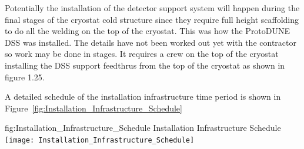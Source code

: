 Potentially the installation of the detector support system will happen during the final stages of the cryostat cold structure since they require full height scaffolding to do all the welding on the top of the cryostat. This was how the ProtoDUNE DSS was installed. The details have not been worked out yet with the contractor so work may be done in stages. It requires a crew on the top of the cryostat installing the DSS support feedthrus from the top of the cryostat as shown in figure 1.25. 
    
A detailed schedule of the installation infrastructure time period is shown in Figure~\ref{fig:Installation_Infrastructure_Schedule}
    
\begin{dunefigure}
{fig:Installation_Infrastructure_Schedule}
    {Installation Infrastructure Schedule}
\texttt{[image: Installation\_Infrastructure\_Schedule]} 
\end{dunefigure}


\clearpage
